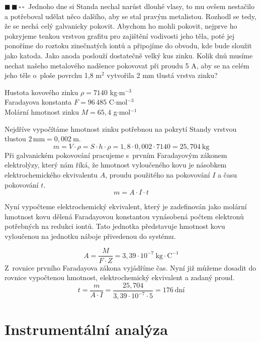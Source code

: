 \documentclass{book}
\newcommand{\dva}{$\blacksquare \, \blacksquare \, \square \, \square \; \; $}
\renewenvironment{quotation}{\par}{\par} %
\begin{document}
\newpage %
\begin{quotation}
\dva Jednoho dne si Standa nechal narůst dlouhé vlasy, to mu ovšem nestačilo
a potřeboval udělat něco dalšího, aby se stal pravým metalistou. Rozhodl
se tedy, že se nechá celý galvanicky pokovit. Abychom ho mohli pokovit,
nejprve ho pokryjeme tenkou vrstvou grafitu pro zajištění vodivosti
jeho těla, poté jej ponoříme do roztoku zinečnatých iontů a připojíme
do obvodu, kde bude sloužit jako katoda. Jako anoda poslouží dostatečně
velký kus zinku. Kolik dnů musíme nechat našeho metalového nadšence
pokovovat při proudu 5 A, aby se na celém jeho těle o~ploše povrchu 1,8 m$^{2}$
vytvořila 2 mm tlustá vrstva zinku?

\noindent\-Hustota kovového zinku $\rho=7140$ kg$\cdot$m$^{-3}$\\
Faradayova konstanta $F=96\,485$ C$\cdot$mol$^{-3}$\\
Molární hmotnost zinku $M=65,4$ g$\cdot$mol$^{-1}$
\end{quotation} \dotfill \par 
Nejdříve vypočítáme hmotnost zinku potřebnou na pokrytí Standy vrstvou
tlustou $2 \, \mathrm{mm}=0,002\ \mathrm{m}$.
\[
m=V\cdot\rho=S\cdot h\cdot\rho=1,8\cdot0,002\cdot7140=25,704\mathrm{~kg}
\]
Při galvanickém pokovování pracujeme s~prvním Faradayovým zákonem
elektrolýzy, který nám říká, že hmotnost vyloučeného kovu je násobkem
elektrochemického ekvivalentu $A$, proudu použitého na pokovování
$I$ a času pokovování $t$. 
\[
m=A\cdot I\cdot t
\]

Nyní vypočteme elektrochemický ekvivalent, který je zadefinován jako
molární hmotnost kovu dělená Faradayovou konstantou vynásobená počtem
elektronů potřebných na redukci iontů. Tato jednotka představuje hmotnost
kovu vyloučenou na jednotku náboje přivedenou do systému.

\[
A=\frac{M}{F\cdot Z}=3,39\cdot10^{-7}\mathrm{~kg\cdot C^{-1}}
\]
Z~rovnice prvního Faradayova zákona vyjádříme čas. Nyní již můžeme
dosadit do rovnice vypočtenou hmotnost, elektrochemický ekvivalent
a zadaný proud. 
\[
t=\frac{m}{A\cdot I}=\frac{25,704}{3,39\cdot10^{-7}\cdot5}=176\mathrm{~dní}
\]


\section{Instrumentální analýza}
\end{document}
